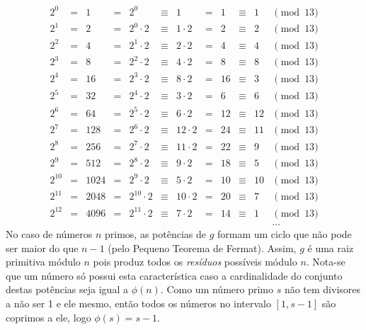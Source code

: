 \documentclass{article}
\begin{document}
\begin{itemize}
\begin{equation*}
\begin{aligned}
2^0    &=& 1    &=& 2^0            &\equiv& 1          &=& 1  &\equiv& 1  &
\pmod{13} \\
2^1    &=& 2    &=& 2^0    \cdot 2 &\equiv& 1  \cdot 2 &=& 2  &\equiv& 2  &
\pmod{13} \\
2^2    &=& 4    &=& 2^1    \cdot 2 &\equiv& 2  \cdot 2 &=& 4  &\equiv& 4  &
\pmod{13} \\
2^3    &=& 8    &=& 2^2    \cdot 2 &\equiv& 4  \cdot 2 &=& 8  &\equiv& 8  &
\pmod{13} \\
2^4    &=& 16   &=& 2^3    \cdot 2 &\equiv& 8  \cdot 2 &=& 16 &\equiv& 3  &
\pmod{13} \\
2^5    &=& 32   &=& 2^4    \cdot 2 &\equiv& 3  \cdot 2 &=& 6  &\equiv& 6  &
\pmod{13} \\
2^6    &=& 64   &=& 2^5    \cdot 2 &\equiv& 6  \cdot 2 &=& 12 &\equiv& 12 &
\pmod{13} \\
2^7    &=& 128  &=& 2^6    \cdot 2 &\equiv& 12 \cdot 2 &=& 24 &\equiv& 11 &
\pmod{13} \\
2^8    &=& 256  &=& 2^7    \cdot 2 &\equiv& 11 \cdot 2 &=& 22 &\equiv& 9  &
\pmod{13} \\
2^9    &=& 512  &=& 2^8    \cdot 2 &\equiv& 9  \cdot 2 &=& 18 &\equiv& 5  &
\pmod{13} \\
2^{10} &=& 1024 &=& 2^9    \cdot 2 &\equiv& 5  \cdot 2 &=& 10 &\equiv& 10 &
\pmod{13} \\
2^{11} &=& 2048 &=& 2^{10} \cdot 2 &\equiv& 10 \cdot 2 &=& 20 &\equiv& 7  &
\pmod{13} \\
2^{12} &=& 4096 &=& 2^{11} \cdot 2 &\equiv& 7  \cdot 2 &=& 14 &\equiv& 1  &
\pmod{13} \\
&&&&&&&&&&& \dots
\end{aligned}
\end{equation*}
No caso de números $n$ primos, as potências de $g$ formam um ciclo que não pode
ser maior do que $n - 1$ (pelo Pequeno Teorema de Fermat). Assim, $g$ é uma raiz
primitiva módulo $n$ pois produz todos os \emph{resíduos} possíveis módulo $n$.
Nota-se que um número só possui esta característica caso a cardinalidade do
conjunto destas potências seja igual a $\phi(n)$. Como um número primo $s$ não
tem divisores a não ser 1 e ele mesmo, então todos os números no intervalo $[1,
s-1]$ são coprimos a ele, logo $\phi(s) = s - 1$.


\end{itemize}
\end{document}
